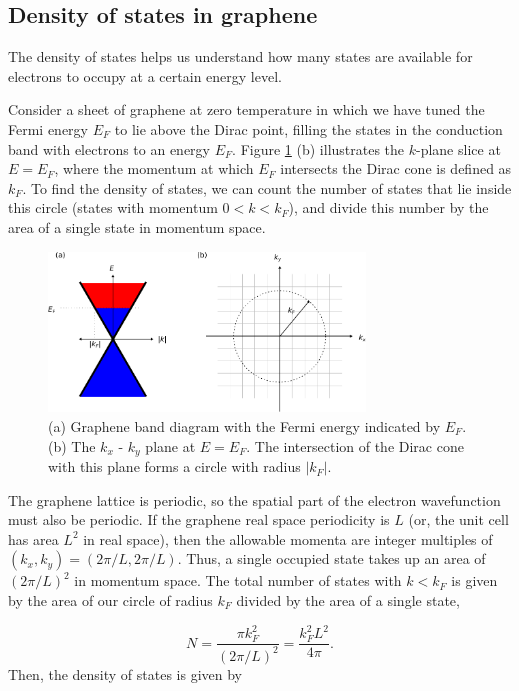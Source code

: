 \documentclass[double,12pt,1in]{beavtex}
\begin{document}
\subsection{Density of states in graphene}
The density of states helps us understand how many states are available for electrons to occupy at a certain energy level.

Consider a sheet of graphene at zero temperature in which we have tuned the Fermi energy $E_F$ to lie above the Dirac point, filling the states in the conduction band with electrons to an energy $E_F$. Figure \ref{density of states graphic} (b) illustrates the $k$-plane slice at $E = E_F$, where the momentum at which $E_F$ intersects the Dirac cone is defined as $k_F$. To find the density of states, we can count the number of states that lie inside this circle (states with momentum $0 < k < k_F$), and divide this number by the area of a single state in momentum space.

\begin{figure}
    \includegraphics[width = 0.75\textwidth]{density of states graphic.pdf}
    \caption{(a) Graphene band diagram with the Fermi energy indicated by $E_F$. (b) The $k_x$ - $k_y$ plane at $E = E_F$. The intersection of the Dirac cone with this plane forms a circle with radius $|k_F|$.}
    \label{density of states graphic}
\end{figure}
The graphene lattice is periodic, so the spatial part of the electron wavefunction must also be periodic. If the graphene real space periodicity is $L$ (or, the unit cell has area $L^2$ in real space), then the allowable momenta are integer multiples of $(k_x, k_y) = (2\pi/L, 2\pi/L)$. Thus, a single occupied state takes up an area of $(2\pi/L)^2$ in momentum space. The total number of states with $k < k_F$ is given by the area of our circle of radius $k_F$ divided by the area of a single state,

\begin{equation}
    N = \frac{\pi k_F^2}{(2\pi/L)^2} = \frac{k_F^2 L^2}{4\pi}. 
\end{equation}
Then, the density of states is given by 
\end{document}
